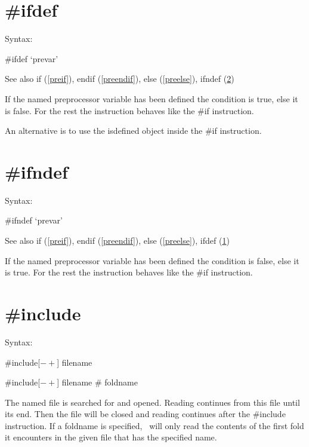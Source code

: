 

\section{\#ifdef}
\label{preifdef}

\noindent Syntax:

\#ifdef `prevar'
 
\noindent See also if (\ref{preif}),
            endif (\ref{preendif}),
            else (\ref{preelse}),
            ifndef (\ref{preifndef})

\noindent If the named preprocessor variable has been 
defined the condition is true, else it is false. For the rest the 
instruction behaves like the \#if instruction.

An alternative is to use the isdefined object inside the \#if instruction.


\section{\#ifndef}
\label{preifndef}

\noindent Syntax:

\#ifndef `prevar'
 
\noindent See also if (\ref{preif}),
            endif (\ref{preendif}),
            else (\ref{preelse}),
            ifdef (\ref{preifdef})

\noindent If the named preprocessor variable has been 
defined the condition is false, else it is true. For the rest the 
instruction behaves like the \#if instruction.


\section{\#include}
\label{preinclude}

\noindent Syntax:

\#include[$-+$] filename

\#include[$-+$] filename \# foldname

\noindent The named file is searched for and opened. 
Reading continues from this file until its end. Then the 
file will be closed and reading continues after the \#include instruction. 
If a foldname is specified, \FORM\ will only read the 
contents of the first fold it encounters in the given file that 
has the specified name.

